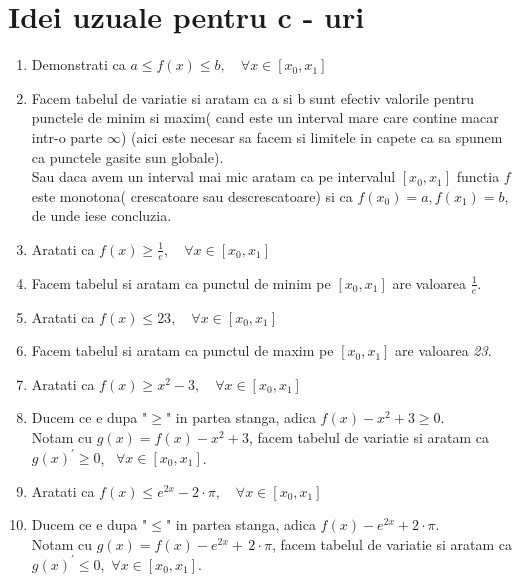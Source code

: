 \documentclass[11pt]{article}
\begin{document}
\section*{Idei uzuale pentru c - uri}
\begin{enumerate}[1)]
    \item   Demonstrati ca $a \leq f(x) \leq b, \quad \forall x \in [x_0, x_1]$
        \item[] Facem tabelul de variatie si aratam ca a si b sunt efectiv valorile pentru punctele de
                minim si maxim( cand este un interval mare care contine macar intr-o parte $\infty$)
                (aici este necesar sa facem si limitele in capete ca sa spunem ca punctele gasite sun
                globale).\\
                Sau daca avem un interval mai mic aratam ca pe intervalul $[x_0, x_1]$ functia $f$ este
                monotona( crescatoare sau descrescatoare) si ca $f(x_0) = a, f(x_1) = b$, de unde iese
                concluzia. 

    \item   Aratati ca $f(x) \geq \frac{1}{e}, \quad \forall x \in [x_0, x_1]$ 
        \item[] Facem tabelul si aratam ca punctul de minim pe $[x_0, x_1]$ are valoarea $\frac{1}{e}$.
        
    \item   Aratati ca $f(x) \leq 23, \quad \forall x \in [x_0, x_1]$ 
        \item[] Facem tabelul si aratam ca punctul de maxim pe $[x_0, x_1]$ are valoarea \textit{23}.

    \item   Aratati ca $f(x) \geq x^2 - 3, \quad \forall x \in [x_0,x_1]$
        \item[] Ducem ce e dupa "$\geq$" in partea stanga, adica $f(x) - x^2 +3 \geq 0$. \\
                Notam cu $g(x) = f(x) - x^2 +3$, facem tabelul de variatie si aratam ca $g(x)^\prime \geq
                0$, \, $\forall x \in [x_0,x_1]$.
                
    \item   Aratati ca $f(x) \leq e^{2x} - 2\cdot \pi, \quad \forall x \in [x_0,x_1]$
        \item[] Ducem ce e dupa "$\leq$" in partea stanga, adica $f(x) - e^{2x} + 2\cdot \pi.$ \\
                Notam cu $g(x) = f(x) -  e^{2x} + \, 2\cdot \pi$, facem tabelul de variatie si aratam ca 
                $g(x)^\prime \leq 0$, \,$\forall x \in [x_0,x_1]$.


\end{enumerate}
\end{document}
